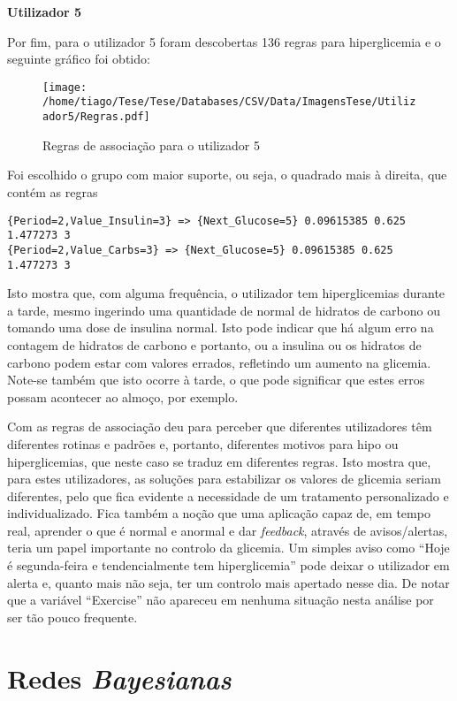 \textbf{Utilizador 5}

Por fim, para o utilizador 5 foram descobertas 136 regras para hiperglicemia e o seguinte gráfico foi obtido:

\begin{figure}[H]
\centering
\texttt{[image: /home/tiago/Tese/Tese/Databases/CSV/Data/ImagensTese/Utilizador5/Regras.pdf]}
\caption{Regras de associação para o utilizador 5}
\end{figure}
Foi escolhido o grupo com maior suporte, ou seja, o quadrado mais à direita, que contém as regras

\begin{lstlisting}
{Period=2,Value_Insulin=3} => {Next_Glucose=5} 0.09615385 0.625      1.477273 3    
{Period=2,Value_Carbs=3} => {Next_Glucose=5} 0.09615385 0.625      1.477273 3    
\end{lstlisting}
Isto mostra que, com alguma frequência, o utilizador tem hiperglicemias durante a tarde, mesmo ingerindo uma quantidade de normal de hidratos de carbono ou tomando uma dose de insulina normal. Isto pode indicar que há algum erro na contagem de hidratos de carbono e portanto, ou a insulina ou os hidratos de carbono podem estar com valores errados, refletindo um aumento na glicemia. Note-se também que isto ocorre à tarde, o que pode significar que estes erros possam acontecer ao almoço, por exemplo.\newline

Com as regras de associação deu para perceber que diferentes utilizadores têm diferentes rotinas e padrões e, portanto, diferentes motivos para hipo ou hiperglicemias, que neste caso se traduz em diferentes regras. Isto mostra que, para estes utilizadores, as soluções para estabilizar os valores de glicemia seriam diferentes, pelo que fica evidente a necessidade de um tratamento personalizado e individualizado. Fica também a noção que uma aplicação capaz de, em tempo real, aprender o que é normal e anormal e dar \textit{feedback}, através de avisos/alertas, teria um papel importante no controlo da glicemia. Um simples aviso como ``Hoje é segunda-feira e tendencialmente tem hiperglicemia'' pode deixar o utilizador em alerta e, quanto mais não seja, ter um controlo mais apertado nesse dia.
De notar que a variável ``Exercise'' não apareceu em nenhuma situação nesta análise por ser tão pouco frequente.

\section{Redes \textit{Bayesianas}}

